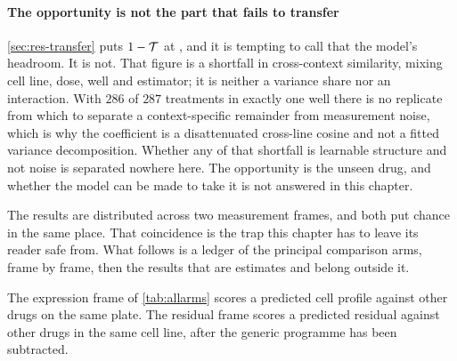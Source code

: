 \paragraph{The opportunity is not the part that fails to transfer}
\cref{sec:res-transfer} puts $1 - \mathcal{T}$ at , and it
is tempting to call that the model's headroom. It is not. That figure is a
shortfall in cross-context similarity, mixing cell line, dose, well and
estimator; it is neither a variance share nor an interaction. With $286$ of $287$
treatments in exactly one well there is no replicate from which to separate a
context-specific remainder from measurement noise, which is why the coefficient
is a disattenuated cross-line cosine and not a fitted variance
decomposition. Whether any of that shortfall is learnable structure and not noise is
separated nowhere here. The opportunity is the unseen drug, and whether the model
can be made to take it is not answered in this chapter.


\begin{question}[0]
The results are distributed across two measurement frames, and both put chance in
the same place. That coincidence is the trap this chapter has to leave its reader
safe from. What follows is a ledger of the principal comparison arms, frame by
frame, then the results that are estimates and belong outside it.
\end{question}

\noindent
The expression frame of \cref{tab:allarms} scores a predicted cell profile
against other drugs on the same plate. The residual frame scores a predicted
residual against other drugs in the same cell line, after the generic programme
has been subtracted.

